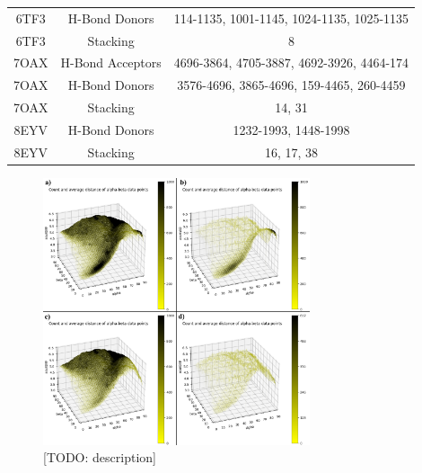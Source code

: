 \begin{table}[H]
\begin{tabular}{ccc}
    6TF3 & H-Bond Donors    & 114-1135, 1001-1145, 1024-1135, 1025-1135                     \\
    6TF3 & Stacking         & 8                                                             \\
    7OAX & H-Bond Acceptors & 4696-3864, 4705-3887, 4692-3926, 4464-174                     \\
    7OAX & H-Bond Donors    & 3576-4696, 3865-4696, 159-4465, 260-4459                      \\
    7OAX & Stacking         & 14, 31                                                        \\
    8EYV & H-Bond Donors    & 1232-1993, 1448-1998                                          \\
    8EYV & Stacking         & 16, 17, 38                                                    \\ \hline
  \end{tabular}
\end{table}


\begin{figure}[H]
  \centering
  \includegraphics[width=0.7\textwidth]{figures/appendix/stacking_sampling.png}
  \caption{\label{fig:appx2/stacking_sampling} [TODO: description]}
\end{figure}


